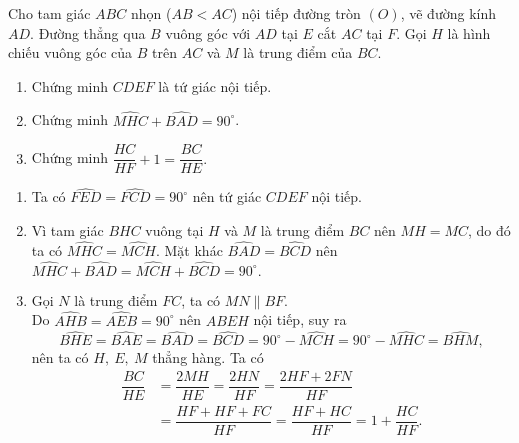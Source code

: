 \begin{ex}%
    Cho tam giác $ABC$ nhọn ($AB < AC$) nội tiếp đường tròn $(O)$, vẽ đường kính $AD$. Đường thẳng qua $B$ vuông góc với $AD$ tại $E$ cắt $AC$ tại $F$. Gọi $H$ là hình chiếu vuông góc của $B$ trên $AC$ và $M$ là trung điểm của $BC$.
\begin{enumerate}
\item Chứng minh $CDEF$ là tứ giác nội tiếp.
\item Chứng minh $\widehat{MHC}+\widehat{BAD}=90^\circ $.
\item Chứng minh $\dfrac{HC}{HF}+1=\dfrac{BC}{HE}.$
\end{enumerate}
\loigiai
    {     \begin{center}
    \end{center}
\begin{enumerate}
    \item Ta có $\widehat{FED}=\widehat{FCD}=90^\circ$ nên tứ giác $CDEF$ nội tiếp.
    \item Vì tam giác $BHC$ vuông tại $H$ và $M$ là trung điểm  $BC$ nên $MH=MC$, do đó ta có $\widehat{MHC}=\widehat{MCH}$.
    Mặt khác $\widehat{BAD}=\widehat{BCD}$ nên 
    $\widehat{MHC}+\widehat{BAD}=\widehat{MCH}+\widehat{BCD} =90^\circ .$
    \item Gọi $N$ là trung điểm $FC$, ta có $MN \parallel BF$.\\
    Do $\widehat{AHB}=\widehat{AEB}=90^\circ$ nên $ABEH$ nội tiếp, suy ra $$\widehat{BHE}=\widehat{BAE}=\widehat{BAD}=\widehat{BCD}=90^\circ-\widehat{MCH}=90^\circ-\widehat{MHC}=\widehat{BHM},$$ nên ta có $H,\ E,\ M$ thẳng hàng. Ta có
    $$\begin{aligned} \dfrac{BC}{HE}&=\dfrac{2MH}{HE}=\dfrac{2HN}{HF}=\dfrac{2HF+2FN}{HF}\\&=\dfrac{HF+HF+FC}{HF}=\dfrac{HF+HC}{HF}=1+\dfrac{HC}{HF}. \end{aligned}$$
    \end{enumerate}
           }
\end{ex}

